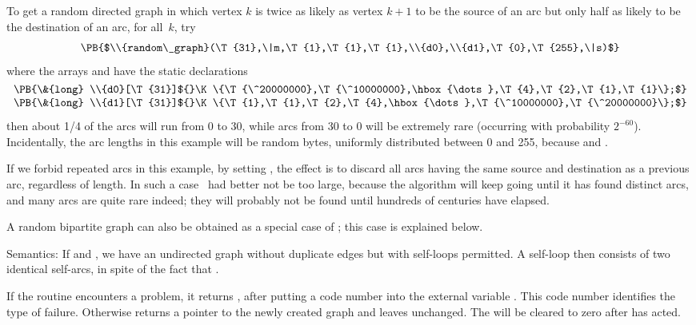 To get a random directed graph in which vertex $k$ is twice as likely
as vertex $k+1$ to be the source of an arc but only half as likely to
be the destination of an arc, for all~$k$, try
$$\hbox{\PB{$\\{random\_graph}(\T{31},\|m,\T{1},\T{1},\T{1},\\{d0},\\{d1},%
\T{0},\T{255},\|s)$}}$$
where the arrays  and  have the static declarations
$$\vbox{
\hbox{\PB{\&{long} \\{d0}[\T{31}]${}\K\{\T{\^20000000},\T{\^10000000},\hbox{%
\dots},\T{4},\T{2},\T{1},\T{1}\};$}}
\hbox{\PB{\&{long} \\{d1}[\T{31}]${}\K\{\T{1},\T{1},\T{2},\T{4},\hbox{\dots},%
\T{\^10000000},\T{\^20000000}\};$}}}$$
then about 1/4 of the arcs will run from 0 to 30, while arcs
from 30 to 0 will be extremely rare (occurring with probability $2^{-60}$).
Incidentally, the arc lengths in this example will be random bytes,
uniformly distributed between 0 and 255, because  and
.

If we forbid repeated arcs in this example, by setting ,
the
effect is to discard all arcs having the same source and destination
as a previous arc, regardless of length. In such a case ~had better not
be too large, because the algorithm will keep going until it has found
 distinct arcs, and many arcs are quite rare indeed; they will
probably not be found until hundreds of centuries have elapsed.

A random bipartite graph can also be obtained as a special case of
; this case is explained below.

Semantics:
If  and , we have an
undirected graph without
duplicate edges but with self-loops permitted. A self-loop then consists of
two identical self-arcs, in spite of the fact that .

\fi

If the  routine encounters a problem, it returns
\PB{$\NULL$}, after putting a code number into the external variable
. This code number identifies the type of failure.
Otherwise  returns a pointer to the newly created graph
and leaves  unchanged. The  will
be
cleared to zero after  has acted.

